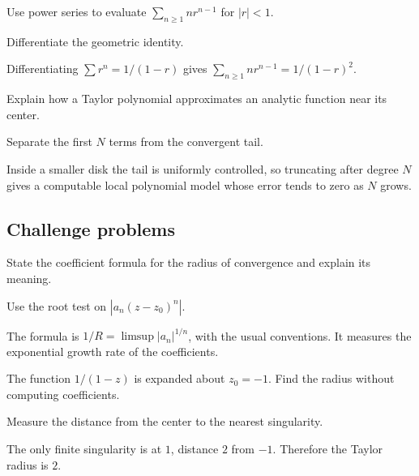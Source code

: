 \begin{exercise}\label{exr:iv03-expand-13}
Use power series to evaluate \(\sum_{n\ge1}nr^{n-1}\) for \(|r|<1\).
\end{exercise}
\begin{hint}
Differentiate the geometric identity.
\end{hint}
\begin{solution}
Differentiating \(\sum r^n=1/(1-r)\) gives \(\sum_{n\ge1}nr^{n-1}=1/(1-r)^2\).
\end{solution}

\begin{exercise}\label{exr:iv03-expand-14}
Explain how a Taylor polynomial approximates an analytic function near its center.
\end{exercise}
\begin{hint}
Separate the first \(N\) terms from the convergent tail.
\end{hint}
\begin{solution}
Inside a smaller disk the tail is uniformly controlled, so truncating after degree \(N\) gives a computable local polynomial model whose error tends to zero as \(N\) grows.
\end{solution}

\subsection*{Challenge problems}

\begin{exercise}\label{exr:iv03-expand-15}
State the coefficient formula for the radius of convergence and explain its meaning.
\end{exercise}
\begin{hint}
Use the root test on \(|a_n(z-z_0)^n|\).
\end{hint}
\begin{solution}
The formula is \(1/R=\limsup |a_n|^{1/n}\), with the usual conventions. It measures the exponential growth rate of the coefficients.
\end{solution}

\begin{exercise}\label{exr:iv03-expand-16}
The function \(1/(1-z)\) is expanded about \(z_0=-1\). Find the radius without computing coefficients.
\end{exercise}
\begin{hint}
Measure the distance from the center to the nearest singularity.
\end{hint}
\begin{solution}
The only finite singularity is at \(1\), distance \(2\) from \(-1\). Therefore the Taylor radius is \(2\).
\end{solution}

